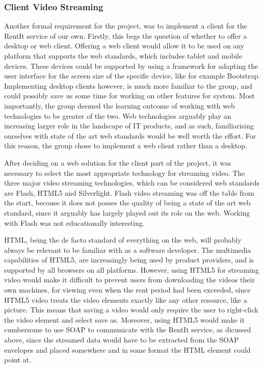 \subsubsection{Client Video Streaming} \label{VideoStreaming}
Another formal requirement for the project, was to implement a client for the RentIt service of our own. Firstly, this begs the question of whether to offer a desktop or web client. Offering a web client would allow it to be used on any platform that supports the web standards, which includes tablet and mobile devices. These devices could be supported by using a framework for adapting the user interface for the screen size of the specific device, like for example Bootstrap. Implementing desktop clients however, is much more familiar to the group, and could possibly save us some time for working on other features for system. Most importantly, the group deemed the learning 	outcome of working with web technologies to be greater of the two. Web technologies arguably play an increasing larger role in the landscape of IT products, and as such, familiarising ourselves with state of the art web standards would be well worth the effort. For this reason, the group chose to implement a web client rather than a desktop.

After deciding on a web solution for the client part of the project, it was necessary to select the most appropriate technology for streaming video. The three major video streaming technologies, which can be considered web standards are Flash, HTML5 and Silverlight.
Flash video streaming was off the table from the start, becouse it does not posses the quality of being a state of the art web standard, since it arguably has largely played out its role on the web. Working with Flash was not educationally interesting.

HTML, being the de facto standard of everything on the web, will probably always be relevant to be familiar with as a software developer. The multimedia capabilities of HTML5, are increasingly being used by product providers, and is supported by all browsers on all platforms. However, using HTML5 for streaming video would make it difficult to prevent users from downloading the videos their own machines, for viewing even when the rent period had been exceeded, since HTML5 video treats the video elements exactly like any other resource, like a picture. This means that saving a video would only require the user to right-click the video element and select save as. Moreover, using HTML5 would make it cumbersome to use SOAP to communicate with the RentIt service, as dicussed above, since the streamed data would have to be extracted from the SOAP envelopes and placed somewhere and in some format the HTML element could point at.

